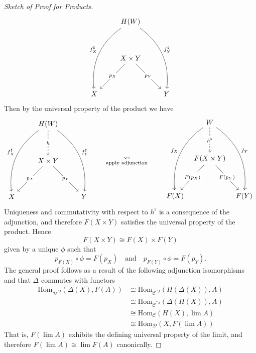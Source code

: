 \begin{proof}[Sketch of Proof for Products]
\[\begin{tikzcd}[row sep=huge]
  & H(W) \arrow[ldd, "f^\sharp_X"', bend right] \arrow[rdd, "f^\sharp_Y", bend left] &   \\
  & X\times Y \arrow[ld, "p_X"' description] \arrow[rd, "p_Y" description]                  &   \\
X &                                                                 & Y
\end{tikzcd}\]
Then by the universal property of the product we have
\[\begin{tikzcd}[row sep=huge]
  & H(W) \arrow[ldd, "f^\sharp_X"', bend right] \arrow[rdd, "f^\sharp_Y", bend left]  \arrow[d, "h"' description, dashed] &   \\
  & X\times Y \arrow[ld, "p_X"' description] \arrow[rd, "p_Y" description]                  &   \\
X &                                                                 & Y
\end{tikzcd}\qquad \underset{\text{apply adjunction}}{\leadsto} \qquad
\begin{tikzcd}[row sep=huge, column sep=tiny]
  & W \arrow[ldd, "f_X"', bend right] \arrow[rdd, "f_Y", bend left]  \arrow[d, "h^\flat"' description, dashed] &   \\
  & F(X\times Y) \arrow[ld, "F(p_X)"' description] \arrow[rd, "F(p_Y)" description]                  &   \\
F(X) &                                                                 & F(Y)
\end{tikzcd}\]
Uniqueness and commutativity with respect to $h^\flat$ is a consequence of the adjunction, and therefore $F(X \times Y)$ satisfies the universal property of the product. Hence
\[F(X \times Y) \cong F(X) \times F(Y)\]
given by a unique $\phi$ such that \[p_{F(X)} \circ \phi = F(p_X) \quad \text{and} \quad p_{F(Y)} \circ \phi = F(p_Y).\]
The general proof follows as a result of the following adjunction isomorphisms and that $\Delta$ commutes with functors
\begin{align*}
\mathrm{Hom}_{\mathcal{D}^{\cat{J}}}(\Delta(X),F(A)) &\cong \mathrm{Hom}_{\mathcal{C}^{\cat{J}}}(H(\Delta(X)),A)\\[0.5em]
&\cong \mathrm{Hom}_{\mathcal{C}^{\cat{J}}}(\Delta(H(X)),A)\\[0.5em]
&\cong \mathrm{Hom}_{\mathcal{C}}(H(X),\lim A)\\[0.5em]
&\cong \mathrm{Hom}_{\mathcal{D}}(X,F(\lim A))
\end{align*}
That is, $F(\lim A)$ exhibits the defining universal property of the limit, and therefore $F(\lim A) \cong \lim F(A)$ canonically.
\end{proof}

